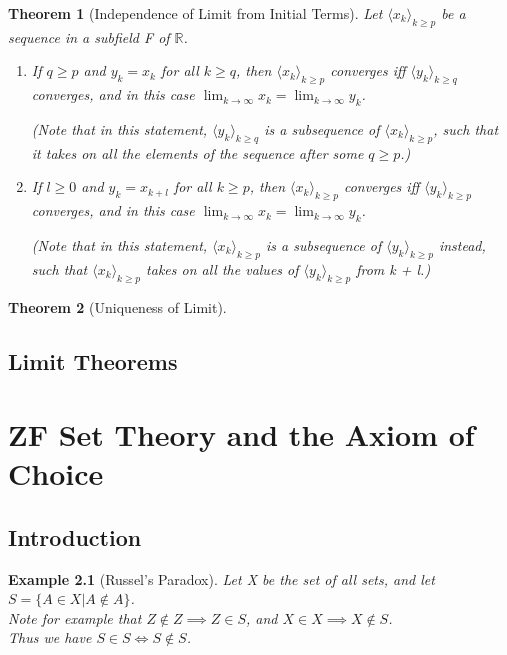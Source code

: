 \documentclass[11pt, oneside]{book}
\theoremstyle{break}
\newtheorem{thm}{Theorem}[section]
\newtheorem{eg}{Example}[section]
\newcommand{\bb}[1]{\mathbb{#1}}		%
\begin{document}
\begin{thm}[Independence of Limit from Initial Terms]
	Let $\langle x_k \rangle_{k \geq p}$ be a sequence in a subfield F of $\bb{R}$.
	\begin{enumerate}
		\item If $q \geq p$ and $y_k = x_k$ for all $k \geq q$, then $\langle x_k \rangle_{k \geq p}$ converges iff $\langle y_k \rangle_{k \geq q}$ converges, and in this case $\lim_{k \to \infty} x_k = \lim_{k \to \infty} y_k$.

		(Note that in this statement, $\langle y_k \rangle_{k \geq q}$ is a subsequence of $\langle x_k \rangle_{k \geq p}$, such that it takes on all the elements of the sequence after some $q \geq p$.)
		\item If $l \geq 0$ and $y_k = x_{k + l}$ for all $k \geq p$, then $\langle x_k \rangle_{k \geq p}$ converges iff $\langle y_k \rangle_{k \geq p}$ converges, and in this case $\lim_{k \to \infty} x_k = \lim_{k \to \infty} y_k$.

		(Note that in this statement, $\langle x_k \rangle_{k \geq p}$ is a subsequence of $\langle y_k \rangle_{k \geq p}$ instead, such that $\langle x_k \rangle_{k \geq p}$ takes on all the values of $\langle y_k \rangle_{k \geq p}$ from k + l.)
	\end{enumerate}
\end{thm}

\begin{thm}[Uniqueness of Limit]
	
\end{thm}


\section{Limit Theorems}

\appendix

\chapter{ZF Set Theory and the Axiom of Choice}\label{apdxA}
\section{Introduction}
\begin{eg}[Russel's Paradox]\label{russel_paradox}
	Let X be the set of all sets, and let $S = \{ A \in X | A \notin A\}$.\\
	Note for example that $Z \notin Z \implies Z \in S$, and $X \in X \implies X \notin S$.\\
	Thus we have $S \in S \iff S \notin S$.
\end{eg}
\end{document}
